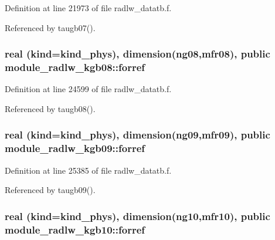 Definition at line 21973 of file radlw\+\_\+datatb.\+f.



Referenced by taugb07().

\subsubsection[{\texorpdfstring{forref}{forref}}]{\setlength{\rightskip}{0pt plus 5cm}real (kind=kind\+\_\+phys), dimension(ng08,mfr08), public module\+\_\+radlw\+\_\+kgb08\+::forref}\hypertarget{group__module__radlw__main_ga8427ec5170f6a61a008a8580be6fe5ec}{}\label{group__module__radlw__main_ga8427ec5170f6a61a008a8580be6fe5ec}


Definition at line 24599 of file radlw\+\_\+datatb.\+f.



Referenced by taugb08().

\subsubsection[{\texorpdfstring{forref}{forref}}]{\setlength{\rightskip}{0pt plus 5cm}real (kind=kind\+\_\+phys), dimension(ng09,mfr09), public module\+\_\+radlw\+\_\+kgb09\+::forref}\hypertarget{group__module__radlw__main_ga72a8c0879636dba20e2a8a35ba79f681}{}\label{group__module__radlw__main_ga72a8c0879636dba20e2a8a35ba79f681}


Definition at line 25385 of file radlw\+\_\+datatb.\+f.



Referenced by taugb09().

\subsubsection[{\texorpdfstring{forref}{forref}}]{\setlength{\rightskip}{0pt plus 5cm}real (kind=kind\+\_\+phys), dimension(ng10,mfr10), public module\+\_\+radlw\+\_\+kgb10\+::forref}\hypertarget{group__module__radlw__main_gaf70e39048d571053790289549dd8333a}{}\label{group__module__radlw__main_gaf70e39048d571053790289549dd8333a}


